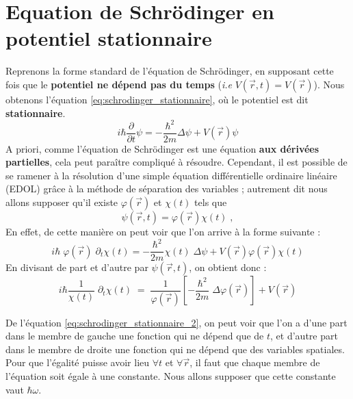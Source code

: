 \documentclass{book}
\begin{document}
\section{Equation de Schrödinger en potentiel stationnaire}
Reprenons la forme standard de l'équation de Schrödinger, en supposant cette fois que le \textbf{potentiel ne dépend pas du temps} (\textit{i.e} $V(\vec{r}, t) = V(\vec{r})$). Nous obtenons l'équation \eqref{eq:schrodinger_stationnaire}, où le potentiel est dit \textbf{stationnaire}. 
\begin{equation} \label{eq:schrodinger_stationnaire}
i\hbar \dfrac{\partial}{\partial t} \psi = -\dfrac{\hbar ^2}{2m} \Delta \psi + V(\vec r) \psi
\end{equation}
A priori, comme l'équation de Schrödinger est une équation \textbf{aux dérivées partielles}, cela peut paraître compliqué à résoudre. 
Cependant, il est possible de se ramener à la résolution d'une simple équation différentielle ordinaire linéaire (EDOL) grâce à la méthode de séparation des variables ; autrement dit nous allons supposer qu'il existe $\varphi(\vec r)$ et $\chi(t)$ tels que $$\psi(\vec r, t) = \varphi(\vec r) \chi(t)\; ,$$
En effet, de cette manière on peut voir que l'on arrive à la forme suivante :
\begin{equation}
  i\hbar \; \varphi(\vec{r}) \; \partial_t \chi(t) = - \frac{\hbar^2}{2m} \chi(t) \; \Delta \psi + V(\vec{r}) \varphi(\vec{r}) \chi(t)
\end{equation}
En divisant de part et d'autre par $\psi (\vec{r}, t)$, on obtient donc : 
\begin{equation}
i\hbar \dfrac{1}{\chi(t)} \; \partial_t \chi(t) \; = \; \dfrac{1}{\varphi(\vec r)} \left[ -\dfrac{\hbar ^2}{2m} \; \Delta \varphi(\vec r) \right] + V(\vec r)
\label{eq:schrodinger_stationnaire_2}
\end{equation}

De l'équation \eqref{eq:schrodinger_stationnaire_2}, on peut voir que l'on a d'une part dans le membre de gauche une fonction qui ne dépend que de $t$, et d'autre part dans le membre de droite une fonction qui ne dépend que des variables spatiales. \\
Pour que l'égalité puisse avoir lieu $\forall t$ et $\forall \vec{r}$, il faut que chaque membre de l'équation soit égale à une constante. Nous allons supposer que cette constante vaut $\hbar \omega$. \\

\end{document}
